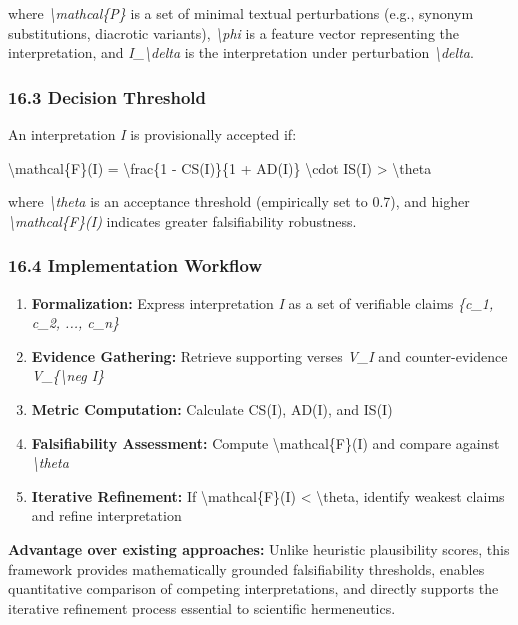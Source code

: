 \documentclass[12pt,a4paper]{article}
\providecommand{\tightlist}{\setlength{\itemsep}{0pt}\setlength{\parskip}{0pt}}
\begin{document}
where \emph{\textbackslash mathcal\{P\}} is a set of minimal textual
perturbations (e.g., synonym substitutions, diacrotic variants),
\emph{\textbackslash phi} is a feature vector representing the
interpretation, and \emph{I\_\textbackslash delta} is the interpretation
under perturbation \emph{\textbackslash delta}.

\subsubsection{16.3 Decision Threshold}\label{decision-threshold}

An interpretation \emph{I} is provisionally accepted if:

\textbackslash mathcal\{F\}(I) = \textbackslash frac\{1 - CS(I)\}\{1 +
AD(I)\} \textbackslash cdot IS(I) \textgreater{} \textbackslash theta

where \emph{\textbackslash theta} is an acceptance threshold
(empirically set to 0.7), and higher
\emph{\textbackslash mathcal\{F\}(I)} indicates greater falsifiability
robustness.

\subsubsection{16.4 Implementation
Workflow}\label{implementation-workflow}

\begin{enumerate}
\tightlist
\item
  \textbf{Formalization:} Express interpretation \emph{I} as a set of
  verifiable claims \emph{\{c\_1, c\_2, ..., c\_n\}}
\item
  \textbf{Evidence Gathering:} Retrieve supporting verses \emph{V\_I}
  and counter-evidence \emph{V\_\{\textbackslash neg I\}}
\item
  \textbf{Metric Computation:} Calculate CS(I), AD(I), and IS(I)
\item
  \textbf{Falsifiability Assessment:} Compute
  \textbackslash mathcal\{F\}(I) and compare against
  \emph{\textbackslash theta}
\item
  \textbf{Iterative Refinement:} If \textbackslash mathcal\{F\}(I)
  \textless{} \textbackslash theta, identify weakest claims and refine
  interpretation
\end{enumerate}

\textbf{Advantage over existing approaches:} Unlike heuristic
plausibility scores, this framework provides mathematically grounded
falsifiability thresholds, enables quantitative comparison of competing
interpretations, and directly supports the iterative refinement process
essential to scientific hermeneutics.
\end{document}
